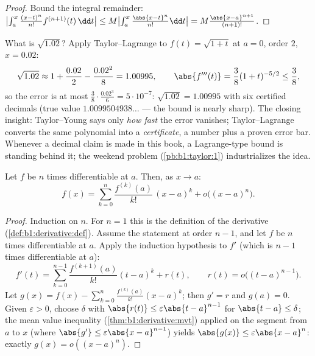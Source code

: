 \begin{proof}
Bound the integral remainder: $\bigl|\int_a^x \frac{(x-t)^n}{n!}
f^{(n+1)}(t)\,\dd t\bigr| \leq M \bigl|\int_a^x
\frac{\abs{x-t}^n}{n!}\dd t\bigr| = M\frac{\abs{x-a}^{n+1}}{(n+1)!}$.
\end{proof}

\begin{example}\label{ex:b1:taylor:certified}
What is $\sqrt{1.02}$? Apply Taylor--Lagrange to $f(t) =
\sqrt{1 + t}$ at $a = 0$, order $2$, $x = 0.02$:
\[
\sqrt{1.02} \approx 1 + \frac{0.02}{2} - \frac{0.02^2}{8}
= 1.00995 ,
\qquad
\abs{f'''(t)} = \frac{3}{8}(1+t)^{-5/2} \leq \frac 38 ,
\]
so the error is at most $\frac38 \cdot \frac{0.02^3}{6} =
5\cdot10^{-7}$: $\sqrt{1.02} = 1.00995$ with six certified
decimals (true value $1.0099504938\dots$ --- the bound is nearly
sharp). The closing insight: Taylor--Young says only \emph{how
fast} the error vanishes; Taylor--Lagrange converts the same
polynomial into a \emph{certificate}, a number plus a proven
error bar. Whenever a decimal claim is made in this book, a
Lagrange-type bound is standing behind it; the weekend problem
(\cref{pb:b1:taylor:1}) industrializes the idea.
\end{example}

\begin{theorem}\label{thm:b1:taylor:young}
Let $f$ be $n$ times differentiable at $a$. Then, as $x \to a$:
\[
f(x) = \sum_{k=0}^{n} \frac{f^{(k)}(a)}{k!}\,(x-a)^k
+ o\bigl((x-a)^n\bigr) .
\]
\end{theorem}

\begin{proof}
Induction on $n$. For $n = 1$ this is the definition of the
derivative (\cref{def:b1:derivative:def}). Assume the statement at
order $n - 1$, and let $f$ be $n$ times differentiable at $a$. Apply
the induction hypothesis to $f'$ (which is $n-1$ times differentiable
at $a$):
\[
f'(t) = \sum_{k=0}^{n-1} \frac{f^{(k+1)}(a)}{k!}(t-a)^k + r(t),
\qquad r(t) = o\bigl((t-a)^{n-1}\bigr).
\]
Let $g(x) = f(x) - \sum_{k=0}^{n} \frac{f^{(k)}(a)}{k!}(x-a)^k$; then
$g' = r$ and $g(a) = 0$. Given $\varepsilon > 0$, choose $\delta$
with $\abs{r(t)} \leq \varepsilon\abs{t - a}^{n-1}$ for $\abs{t-a}
\leq \delta$; the mean value inequality
(\cref{thm:b1:derivative:mvt}) applied on the segment from $a$ to
$x$ (where $\abs{g'} \leq \varepsilon\abs{x-a}^{n-1}$) yields
$\abs{g(x)} \leq \varepsilon\abs{x - a}^n$: exactly $g(x) =
o((x-a)^n)$.
\end{proof}


